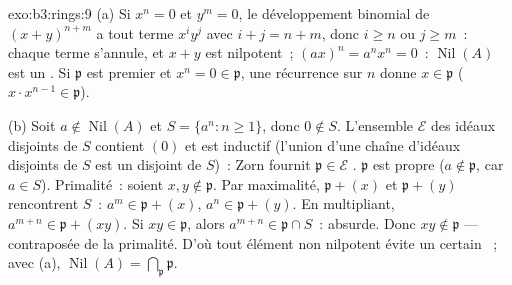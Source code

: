 \begin{solution}{exo:b3:rings:9}
(a) Si $x^n = 0$ et $y^m = 0$, le développement binomial de
$(x+y)^{n+m}$ a tout terme $x^iy^j$ avec $i + j = n + m$, donc
$i \geq n$ ou $j \geq m$~: chaque terme s'annule, et $x + y$ est
nilpotent~; $(ax)^n = a^nx^n = 0$~: $\operatorname{Nil}(A)$ est
un . Si $\mathfrak p$ est premier et $x^n = 0 \in
\mathfrak p$, une récurrence sur $n$ donne $x \in \mathfrak p$
($x \cdot x^{n-1} \in \mathfrak p$).

(b) Soit $a \notin \operatorname{Nil}(A)$ et $S = \{a^n : n \geq
1\}$, donc $0 \notin S$. L'ensemble $\mathcal E$ des idéaux
disjoints de $S$ contient $(0)$ et est inductif (l'union d'une
chaîne d'idéaux disjoints de $S$ est un  disjoint de $S$)~:
Zorn fournit $\mathfrak p \in \mathcal E$ . $\mathfrak
p$ est propre ($a \notin \mathfrak p$, car $a \in S$).
Primalité~: soient $x, y \notin \mathfrak p$. Par maximalité,
$\mathfrak p + (x)$ et $\mathfrak p + (y)$ rencontrent $S$~:
$a^m \in \mathfrak p + (x)$, $a^n \in \mathfrak p + (y)$. En
multipliant, $a^{m+n} \in \mathfrak p + (xy)$. Si $xy \in
\mathfrak p$, alors $a^{m+n} \in \mathfrak p \cap S$~:
absurde. Donc $xy \notin \mathfrak p$ --- contraposée de la
primalité. D'où tout élément non nilpotent évite un certain
~; avec (a), $\operatorname{Nil}(A) =
\bigcap_{\mathfrak p} \mathfrak p$.
\end{solution}

